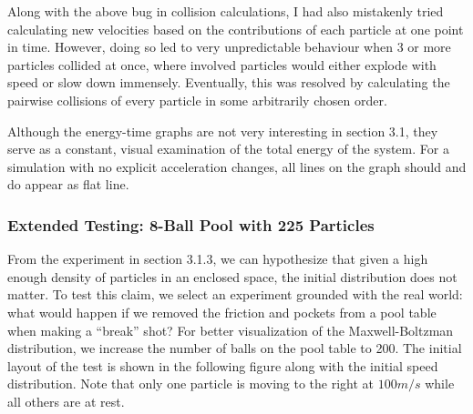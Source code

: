 \documentclass{article}
\begin{document}
Along with the above bug in collision calculations, I had also mistakenly tried calculating new velocities
based on the contributions of each particle at one point in time.
However, doing so led to very unpredictable behaviour when 3 or more particles collided at once, where
involved particles would either explode with speed or slow down immensely.
Eventually, this was resolved by calculating the pairwise collisions of every particle in some arbitrarily chosen order.

Although the energy-time graphs are not very interesting in section 3.1,
they serve as a constant, visual examination of the total energy of the system.
For a simulation with no explicit acceleration changes, all lines on the graph should and do appear as flat line.

\subsubsection{Extended Testing: 8-Ball Pool with 225 Particles}
From the experiment in section 3.1.3, we can hypothesize that given a high enough density of particles in an enclosed space,
the initial distribution does not matter. To test this claim, we select an experiment grounded with the real world:
what would happen if we removed the friction and pockets from a pool table when making a ``break'' shot?
For better visualization of the Maxwell-Boltzman distribution, we increase the number of balls on the pool table to 200.
The initial layout of the test is shown in the following figure along with the initial speed distribution.
Note that only one particle is moving to the right at $100 m/s$ while all others are at rest.
\\
\end{document}

